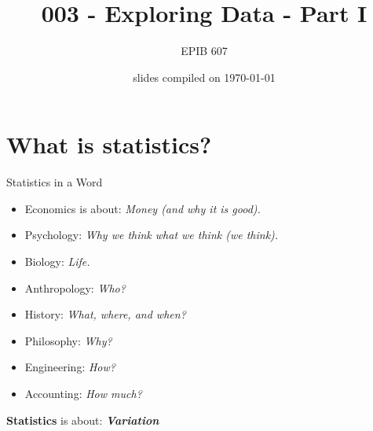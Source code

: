 \documentclass[10pt,handout]{beamer}\usepackage[]{graphicx}\usepackage[]{color}
\begin{document}
	
	
	
	
	\title{003 - Exploring Data - Part I}
	\author{EPIB 607}
	
	\date{slides compiled on \today}
	
	\maketitle

\section{What is statistics?}

\begin{frame}{Statistics in a Word}

\begin{itemize}
	\item Economics is about: \textit{Money (and why it is good).}
	\item Psychology: \textit{Why we think what we think (we think).}
	\item Biology: \textit{Life.}
	\item Anthropology: \textit{Who?}
	\item History: \textit{What, where, and when?}
	\item Philosophy: \textit{Why?}
	\item Engineering: \textit{How?}
	\item Accounting: \textit{How much?}
\end{itemize}

\pause 
\vspace*{0.2in}

\textbf{\textcolor{myblue}{Statistics}} is about: \textit{\textbf{Variation}}

\end{frame}
\end{document}
